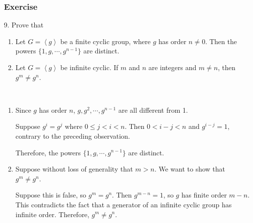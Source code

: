 \documentclass{beamer}
\begin{document}
\begin{frame}
    \frametitle{Exercise}  
    9. Prove that
    \begin{enumerate}
        \item Let $G = \left\langle g \right\rangle$ be a finite cyclic group, where $g$ has order $n \neq 0$. Then the powers $\{1, g, \cdots , g^{n−1}\}$ are distinct.
        \item Let $G = \left\langle g\right\rangle $ be infinite cyclic. If $m$ and $n$ are integers and $m \neq n$, then $g^m \neq g^n$.
    \end{enumerate}
    \pause
    \\
    \begin{enumerate}
        \item Since $g$ has order $n$, $g, g^2, \cdots, g^{n−1}$ are all different from 1.
        \par Suppose $g^i = g^j$ where $0 \leqslant j < i < n$. Then $0 < i − j < n$ and $g^{i−j} = 1$, contrary to the preceding observation.
        \par Therefore, the powers $\{1, g, \cdots , g^{n−1}\}$ are distinct.
        \item Suppose without loss of generality that $m > n$. We want to show that $g^m \neq g^n$.
        \par Suppose this is false, so  $g^m = g^n$. Then $g^{m−n} = 1$, so $g$ has finite order $m-n$. This contradicts the fact that a	generator of an infinite cyclic group has infinite order. Therefore,  $g^m \neq g^n$.
    \end{enumerate}
\end{frame}
\end{document}

